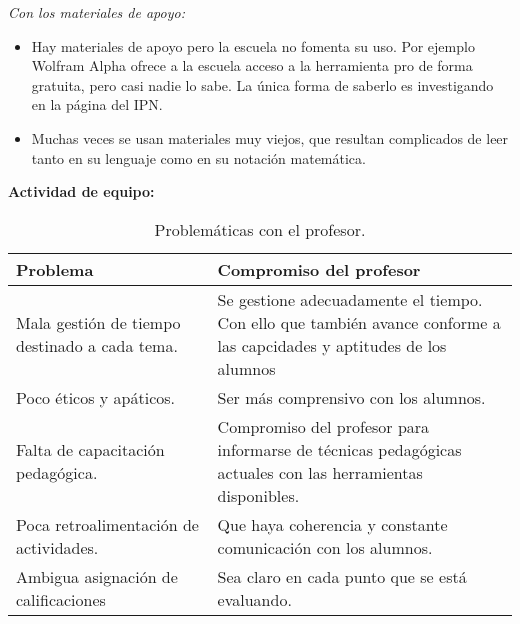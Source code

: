 \documentclass[12pt]{report}
\theoremstyle{largebreak}
\begin{document}
    \textit{Con los materiales de apoyo:}

    \begin{itemize}
        \item Hay materiales de apoyo pero la escuela no fomenta su uso. Por ejemplo Wolfram Alpha ofrece a la escuela acceso a la herramienta pro de forma gratuita, pero casi nadie lo sabe. La única forma de saberlo es investigando en la página del IPN.
        \item Muchas veces se usan materiales muy viejos, que resultan complicados de leer tanto en su lenguaje como en su notación matemática.
    \end{itemize}

    \newpage

    \begin{center}
        \textbf{Actividad de equipo:}
    \end{center}

    \begin{table}[ht]
        \begin{center}
            \begin{tabular}{p{0.4\linewidth} | p{0.6\linewidth}}
                \hline
                \hline
                Problema & Compromiso del profesor \\
                \hline
                \hline
                Mala gestión de tiempo destinado a cada tema. & Se gestione adecuadamente el tiempo. Con ello que también avance conforme a las capcidades y aptitudes de los alumnos \\
                \hline
                Poco éticos y apáticos. & Ser más comprensivo con los alumnos. \\
                \hline
                Falta de capacitación pedagógica. & Compromiso del profesor para informarse de técnicas pedagógicas actuales con las herramientas disponibles. \\
                \hline
                Poca retroalimentación de actividades. & Que haya coherencia y constante comunicación con los alumnos. \\
                \hline 
                Ambigua asignación de calificaciones & Sea claro en cada punto que se está evaluando. \\
                \hline
            \end{tabular}
            \caption{Problemáticas con el profesor.}
        \end{center}
    \end{table}
\end{document}
